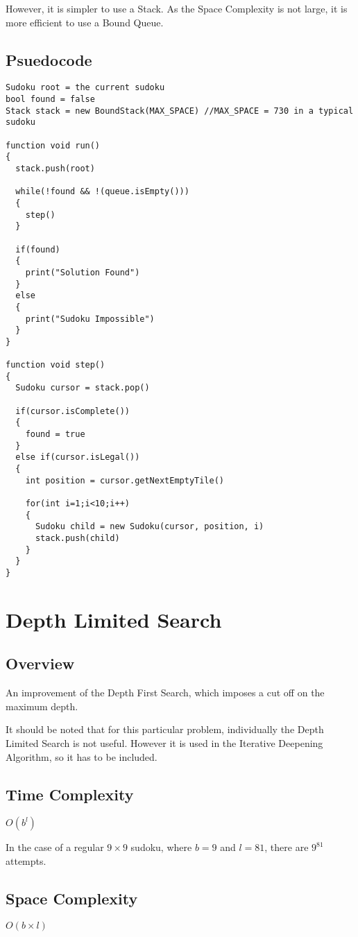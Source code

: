 \documentclass[10pt,letterpaper]{article}
\begin{document}
      However, it is simpler to use a Stack. As the Space Complexity is not large, it is more efficient to use a Bound Queue.
    \newpage
    \subsection{Psuedocode}
      \begin{verbatim}
Sudoku root = the current sudoku
bool found = false
Stack stack = new BoundStack(MAX_SPACE) //MAX_SPACE = 730 in a typical sudoku

function void run()
{
  stack.push(root)
  
  while(!found && !(queue.isEmpty()))
  {
    step()
  }
  
  if(found)
  {
    print("Solution Found")
  }
  else
  {
    print("Sudoku Impossible")
  }
}

function void step()
{
  Sudoku cursor = stack.pop()
  
  if(cursor.isComplete())
  {
    found = true
  }
  else if(cursor.isLegal())
  {
    int position = cursor.getNextEmptyTile()
      
    for(int i=1;i<10;i++)
    {
      Sudoku child = new Sudoku(cursor, position, i)
      stack.push(child)
    }
  }
}
      \end{verbatim}
    
  \newpage
  \section{Depth Limited Search}
    \subsection{Overview}
      An improvement of the Depth First Search, which imposes a cut off on the maximum depth.
      
      It should be noted that for this particular problem, individually the Depth Limited Search is not useful. However it is used in the Iterative Deepening Algorithm, so it has to be included.
    
    \subsection{Time Complexity}
      \(O(b^l)\)
      
      In the case of a regular \(9\times 9\) sudoku, where  \(b = 9\) and \(l = 81\), there are \(9^{81}\) attempts.
      
    \subsection{Space Complexity}
      \(O(b\times l)\)
      
\end{document}
